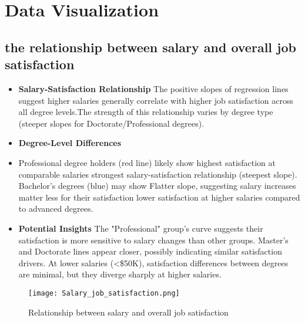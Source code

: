 \documentclass[12pt]{article}
\begin{document}
\section{Data Visualization}
\subsection{ the relationship between salary and overall job satisfaction}

\begin{itemize}
    \item \textbf{Salary-Satisfaction Relationship}
    The positive slopes of regression lines suggest higher salaries generally correlate with higher job satisfaction across all degree levels.The strength of this relationship varies by degree type (steeper slopes for Doctorate/Professional degrees).
    \item \textbf{Degree-Level Differences}
    \item Professional degree holders (red line) likely show highest satisfaction at comparable salaries strongest salary-satisfaction relationship (steepest slope). Bachelor's degrees (blue) may show Flatter slope, suggesting salary increases matter less for their satisfaction lower satisfaction at higher salaries compared to advanced degrees.
    \item \textbf{Potential Insights}
    The "Professional" group's curve suggests their satisfaction is more sensitive to salary changes than other groups. Master's and Doctorate lines appear closer, possibly indicating similar satisfaction drivers. At lower salaries (<\$50K), satisfaction differences between degrees are minimal, but they diverge sharply at higher salaries.
\end{itemize}


\begin{figure}[h]
\centering
\texttt{[image: Salary\_job\_satisfaction.png]}
\caption{Relationship between salary and overall job satisfaction}
\end{figure}
\end{document}
